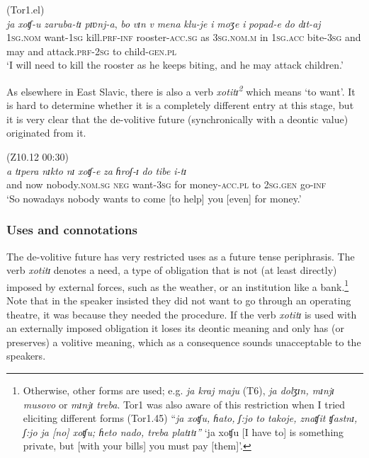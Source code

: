 \documentclass[output=paper,colorlinks,citecolor=brown]{langscibook}
\begin{document}
\ea \label{ex:roncero:14}
    (Tor1.el)\\
    \gll \textit{ja} \textit{xoʧ-u} \textit{zaruba-tɪ} \textit{pɪʋnj-a}, \textit{bo} \textit{vɪn} \textit{v} \textit{mena} \textit{klu-je} \textit{i} \textit{moʒe} \textit{i} \textit{popad-e} \textit{do} \textit{dɪt-aj}\\
    1\textsc{sg.nom} want-\textsc{1sg} kill.\textsc{prf-inf} rooster-\textsc{acc.sg} as 3\textsc{sg.nom.m} in 1\textsc{sg.acc} bite-\textsc{3sg} and may and attack.\textsc{prf-2sg} to child-\textsc{gen.pl}\\
    \glt ‘I will need to kill the rooster as he keeps biting, and he may attack children.’
\z


As elsewhere in East Slavic, there is also a verb \textit{xotitɪ\textsuperscript{2}} which means ‘to want’. It is hard to determine whether it is a completely different entry at this stage, but it is very clear that the de-volitive future (synchronically with a deontic value) originated from it.

\ea \label{ex:roncero:15}
    (Z10.12 00:30)\\
    \gll \textit{a} \textit{tɪpera} \textit{nɪkto} \textit{nɪ} \textit{xoʧ-e} \textit{za} \textit{ɦroʃ-ɪ} \textit{do} \textit{tibe} \textit{i-tɪ}\\
    and now nobody.\textsc{nom.sg} \textsc{neg} want-\textsc{3sg} for money-\textsc{acc.pl} to 2\textsc{sg.gen} go-\textsc{inf}\\
    \glt ‘So nowadays nobody wants to come [to help] you [even] for money.’
\z

\subsubsection{Uses and connotations} \label{sec:roncero:2.2.2}
The de-volitive future has very restricted uses as a future tense periphrasis. The verb \textit{xotitɪ} denotes a need, a type of obligation that is not (at least directly) imposed by external forces, such as the weather, or an institution like a bank.\footnote{Otherwise, other forms are used; e.g. \textit{ja kraj maju} (T6), \textit{ja dolʒɪn, mɪnjɪ musovo} or \textit{mɪnjɪ treba}. Tor1 was also aware of this restriction when I tried eliciting different forms (Tor1.45) “\textit{ja xoʧu, ɦato, ʃ:jo to takoje, znaʧit ʧastnɪ, ʃ:jo ja [no] xoʧu; ɦeto nado, treba platɪtɪ”} ‘ja xoʧu [I have to] is something private, but [with your bills] you must pay [them]’.} Note that in  the speaker insisted they did not want to go through an operating theatre, it was because they needed the procedure. If the verb \textit{xotitɪ} is used with an externally imposed obligation it loses its deontic meaning and only has (or preserves) a volitive meaning, which as a consequence sounds unacceptable to the speakers.
\end{document}
